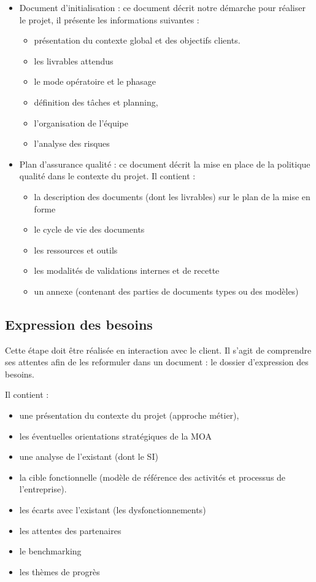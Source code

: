 \begin{itemize}
    \item Document d’initialisation : ce document décrit notre démarche pour réaliser le projet, il présente les informations suivantes :
    \begin{itemize}
        \item présentation du contexte global et des objectifs clients.
        \item les livrables attendus
        \item le mode opératoire et le phasage
        \item définition des tâches et planning,
        \item l’organisation de l’équipe
        \item l’analyse des risques
    \end{itemize}
    \item Plan d’assurance qualité : ce document décrit la mise en place de la politique qualité dans le contexte du projet. Il contient :
    \begin{itemize}
        \item la description des documents (dont les livrables) sur le plan de la mise en forme
        \item le cycle de vie des documents
        \item les ressources et outils
        \item les modalités de validations internes et de recette
        \item un annexe (contenant des parties de documents types ou des modèles)
    \end{itemize}
\end{itemize}

\subsection{Expression des besoins}

Cette étape doit être réalisée en interaction avec le client. Il s’agit de comprendre ses attentes afin de les reformuler dans un document : le dossier d’expression des besoins.

Il contient :
\begin{itemize}
    \item une présentation du contexte du projet (approche métier),
    \item les éventuelles orientations stratégiques de la MOA
    \item une analyse de l’existant (dont le SI)
    \item la cible fonctionnelle (modèle de référence des activités et processus de l’entreprise).
    \item les écarts avec l’existant (les dysfonctionnements)
    \item les attentes des partenaires
    \item le benchmarking
    \item les thèmes de progrès
\end{itemize}

